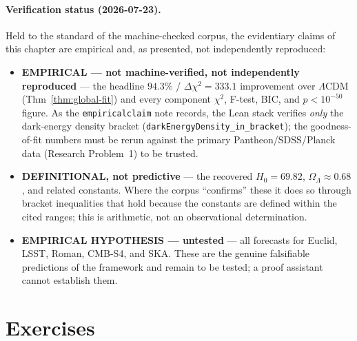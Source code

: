 \paragraph{Verification status (2026-07-23).}
Held to the standard of the machine-checked corpus, the evidentiary claims of this
chapter are empirical and, as presented, not independently reproduced:
\begin{itemize}
\item \textbf{EMPIRICAL --- not machine-verified, not independently reproduced} ---
  the headline $94.3\%$ / $\Delta\chi^2=333.1$ improvement over $\Lambda$CDM
  (Thm~\ref{thm:global-fit}) and every component $\chi^2$, F-test, BIC, and
  $p<10^{-50}$ figure. As the \texttt{empiricalclaim} note records, the Lean stack
  verifies \emph{only} the dark-energy density bracket
  (\texttt{darkEnergyDensity\_in\_bracket}); the goodness-of-fit numbers must be
  rerun against the primary Pantheon/SDSS/Planck data (Research Problem~1) to be
  trusted.
\item \textbf{DEFINITIONAL, not predictive} --- the recovered
  $H_0=69.82$, $\Omega_\Lambda\approx0.68$, and related constants. Where the corpus
  ``confirms'' these it does so through bracket inequalities that hold because the
  constants are defined within the cited ranges; this is arithmetic, not an
  observational determination.
\item \textbf{EMPIRICAL HYPOTHESIS --- untested} --- all forecasts for Euclid, LSST,
  Roman, CMB-S4, and SKA. These are the genuine falsifiable predictions of the
  framework and remain to be tested; a proof assistant cannot establish them.
\end{itemize}

\section*{Exercises}

